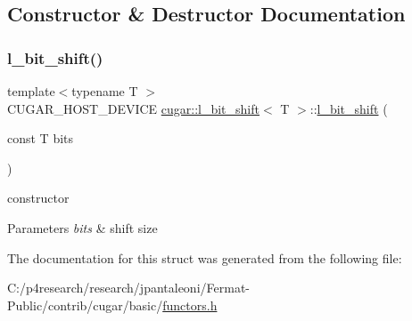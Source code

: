 \subsection{Constructor \& Destructor Documentation}
\mbox{\label{structcugar_1_1l__bit__shift_af5671df9afabf506684e4b7a5a928d7d}} 
\subsubsection{\texorpdfstring{l\+\_\+bit\+\_\+shift()}{l\_bit\_shift()}}
{\footnotesize\ttfamily template$<$typename T $>$ \\
C\+U\+G\+A\+R\+\_\+\+H\+O\+S\+T\+\_\+\+D\+E\+V\+I\+CE \hyperlink{structcugar_1_1l__bit__shift}{cugar\+::l\+\_\+bit\+\_\+shift}$<$ T $>$\+::\hyperlink{structcugar_1_1l__bit__shift}{l\+\_\+bit\+\_\+shift} (\begin{DoxyParamCaption}\item[{const T}]{bits }\end{DoxyParamCaption})\hspace{0.3cm}{\ttfamily [inline]}}

constructor


\begin{DoxyParams}{Parameters}
{\em bits} & shift size \\
\hline
\end{DoxyParams}


The documentation for this struct was generated from the following file\+:\begin{DoxyCompactItemize}
\item 
C\+:/p4research/research/jpantaleoni/\+Fermat-\/\+Public/contrib/cugar/basic/\hyperlink{functors_8h}{functors.\+h}\end{DoxyCompactItemize}
